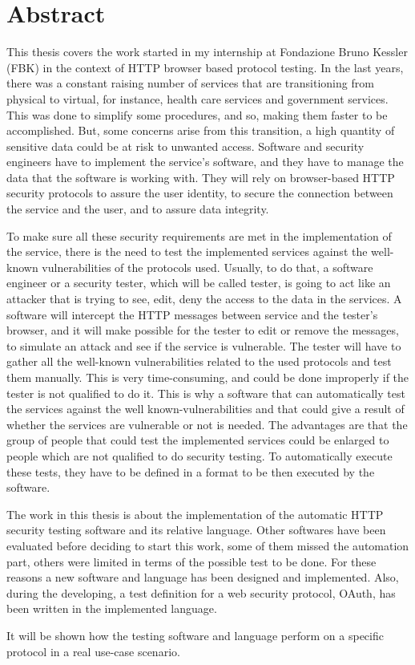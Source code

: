 \chapter*{Abstract} %

This thesis covers the work started in my internship at Fondazione Bruno Kessler (FBK) in the context of HTTP browser based protocol testing.
In the last years, there was a constant raising number of services that are transitioning from physical to virtual, for instance, health care services and government services. This was done to simplify some procedures, and so, making them faster to be accomplished. But, some concerns arise from this transition, a high quantity of sensitive data could be at risk to unwanted access. Software and security engineers have to implement the service's software, and they have to manage the data that the software is working with. They will rely on browser-based HTTP security protocols to assure the user identity, to secure the connection between the service and the user, and to assure data integrity. 

To make sure all these security requirements are met in the implementation of the service, there is the need to test the implemented services against the well-known vulnerabilities of the protocols used. Usually, to do that, a software engineer or a security tester, which will be called tester, is going to act like an attacker that is trying to see, edit, deny the access to the data in the services. A software will intercept the HTTP messages between service and the tester's browser, and it will make possible for the tester to edit or remove the messages, to simulate an attack and see if the service is vulnerable. The tester will have to gather all the well-known vulnerabilities related to the used protocols and test them manually. This is very time-consuming, and could be done improperly if the tester is not qualified to do it. This is why a software that can automatically test the services against the well known-vulnerabilities and that could give a result of whether the services are vulnerable or not is needed. The advantages are that the group of people that could test the implemented services could be enlarged to people which are not qualified to do security testing. To automatically execute these tests, they have to be defined in a format to be then executed by the software. 

The work in this thesis is about the implementation of the automatic HTTP security testing software and its relative language. Other softwares have been evaluated before deciding to start this work, some of them missed the automation part, others were limited in terms of the possible test to be done. For these reasons a new software and language has been designed and implemented. Also, during the developing, a test definition for a web security protocol, OAuth, has been written in the implemented language.

It will be shown how the testing software and language perform on a specific protocol in a real use-case scenario.




